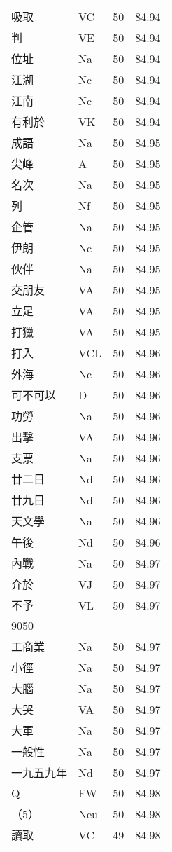 \documentclass[twocolumn]{book}
\begin{document}
\begin{supertabular}{llrr}
吸取 & VC & 50 &  84.94\\
判 & VE & 50 &  84.94\\
位址 & Na & 50 &  84.94\\
江湖 & Nc & 50 &  84.94\\
江南 & Nc & 50 &  84.94\\
有利於 & VK & 50 &  84.94\\
成語 & Na & 50 &  84.95\\
尖峰 & A & 50 &  84.95\\
名次 & Na & 50 &  84.95\\
列 & Nf & 50 &  84.95\\
企管 & Na & 50 &  84.95\\
伊朗 & Nc & 50 &  84.95\\
伙伴 & Na & 50 &  84.95\\
交朋友 & VA & 50 &  84.95\\
立足 & VA & 50 &  84.95\\
打獵 & VA & 50 &  84.95\\
打入 & VCL & 50 &  84.96\\
外海 & Nc & 50 &  84.96\\
可不可以 & D & 50 &  84.96\\
功勞 & Na & 50 &  84.96\\
出擊 & VA & 50 &  84.96\\
支票 & Na & 50 &  84.96\\
廿二日 & Nd & 50 &  84.96\\
廿九日 & Nd & 50 &  84.96\\
天文學 & Na & 50 &  84.96\\
午後 & Nd & 50 &  84.96\\
內戰 & Na & 50 &  84.97\\
介於 & VJ & 50 &  84.97\\
不予 & VL & 50 &  84.97\\
9050\\
工商業 & Na & 50 &  84.97\\
小徑 & Na & 50 &  84.97\\
大腦 & Na & 50 &  84.97\\
大哭 & VA & 50 &  84.97\\
大軍 & Na & 50 &  84.97\\
一般性 & Na & 50 &  84.97\\
一九五九年 & Nd & 50 &  84.97\\
Q & FW & 50 &  84.98\\
（5） & Neu & 50 &  84.98\\
讀取 & VC & 49 &  84.98\\

\end{supertabular}
\end{document}
